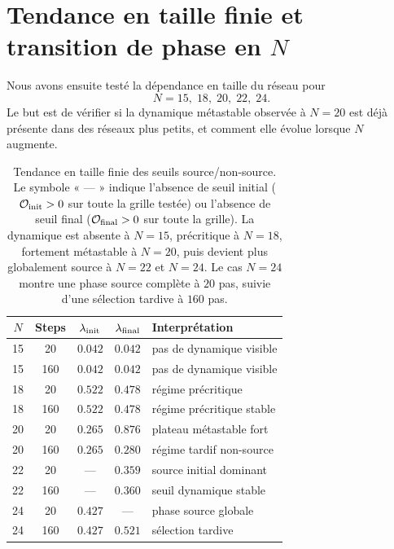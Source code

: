 \documentclass[11pt,a4paper]{article}
\begin{document}
\section{Tendance en taille finie et transition de phase en \(N\)}

Nous avons ensuite testé la dépendance en taille du réseau pour
\[
N=15,\;18,\;20,\;22,\;24.
\]
Le but est de vérifier si la dynamique métastable observée à \(N=20\) est déjà
présente dans des réseaux plus petits, et comment elle évolue lorsque \(N\)
augmente.

\begin{table}[htbp]
\centering
\begin{tabular}{c c c c l}
\toprule
\(N\) & Steps & \(\lambda_{\rm init}\) & \(\lambda_{\rm final}\) & Interprétation \\
\midrule
15 & 20  & \(0.042\) & \(0.042\) & pas de dynamique visible \\
15 & 160 & \(0.042\) & \(0.042\) & pas de dynamique visible \\
18 & 20  & \(0.522\) & \(0.478\) & régime précritique \\
18 & 160 & \(0.522\) & \(0.478\) & régime précritique stable \\
20 & 20  & \(0.265\) & \(0.876\) & plateau métastable fort \\
20 & 160 & \(0.265\) & \(0.280\) & régime tardif non-source \\
22 & 20  & — & \(0.359\) & source initial dominant \\
22 & 160 & — & \(0.360\) & seuil dynamique stable \\
24 & 20  & \(0.427\) & — & phase source globale \\
24 & 160 & \(0.427\) & \(0.521\) & sélection tardive \\
\bottomrule
\end{tabular}
\caption{
Tendance en taille finie des seuils source/non-source.
Le symbole « — » indique l’absence de seuil initial (\(\mathcal{O}_{\rm init}>0\)
sur toute la grille testée) ou l’absence de seuil final (\(\mathcal{O}_{\rm final}>0\)
sur toute la grille). La dynamique est absente à \(N=15\), précritique à \(N=18\),
fortement métastable à \(N=20\), puis devient plus globalement source à \(N=22\)
et \(N=24\). Le cas \(N=24\) montre une phase source complète à \(20\) pas,
suivie d'une sélection tardive à \(160\) pas.
}
\label{tab:finite-size}
\end{table}
\end{document}
